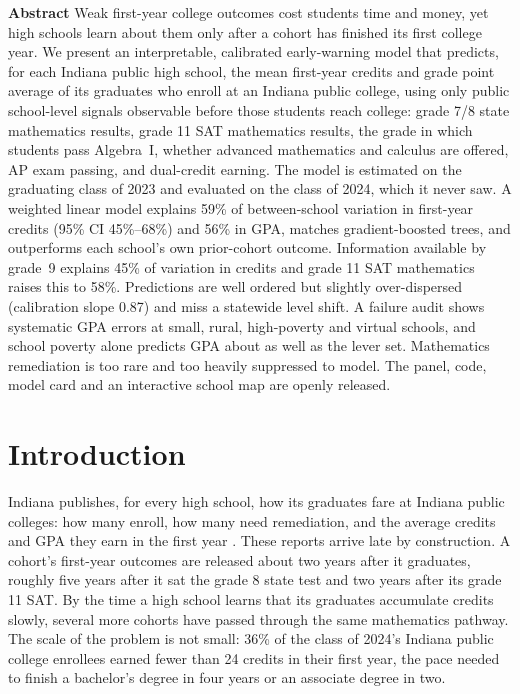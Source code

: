 \documentclass[11pt]{article}
\begin{document}
\thispagestyle{fancy}

\vspace{0.6ex}

\vspace{2.2ex}
\noindent\textbf{Abstract} Weak first-year college outcomes cost students time and money, yet high schools learn about them only after a cohort has finished its first college year. We present an interpretable, calibrated early-warning model that predicts, for each Indiana public high school, the mean first-year credits and grade point average of its graduates who enroll at an Indiana public college, using only public school-level signals observable before those students reach college: grade 7/8 state mathematics results, grade 11 SAT mathematics results, the grade in which students pass Algebra~I, whether advanced mathematics and calculus are offered, AP exam passing, and dual-credit earning. The model is estimated on the graduating class of 2023 and evaluated on the class of 2024, which it never saw. A weighted linear model explains 59\% of between-school variation in first-year credits (95\% CI 45\%--68\%) and 56\% in GPA, matches gradient-boosted trees, and outperforms each school's own prior-cohort outcome. Information available by grade~9 explains 45\% of variation in credits and grade 11 SAT mathematics raises this to 58\%. Predictions are well ordered but slightly over-dispersed (calibration slope 0.87) and miss a statewide level shift. A failure audit shows systematic GPA errors at small, rural, high-poverty and virtual schools, and school poverty alone predicts GPA about as well as the lever set. Mathematics remediation is too rare and too heavily suppressed to model. The panel, code, model card and an interactive school map are openly released.

\section{Introduction}

Indiana publishes, for every high school, how its graduates fare at Indiana public colleges: how many enroll, how many need remediation, and the average credits and GPA they earn in the first year \citep{che2026}. These reports arrive late by construction. A cohort's first-year outcomes are released about two years after it graduates, roughly five years after it sat the grade 8 state test and two years after its grade 11 SAT. By the time a high school learns that its graduates accumulate credits slowly, several more cohorts have passed through the same mathematics pathway. The scale of the problem is not small: 36\% of the class of 2024's Indiana public college enrollees earned fewer than 24 credits in their first year, the pace needed to finish a bachelor's degree in four years or an associate degree in two.
\end{document}
